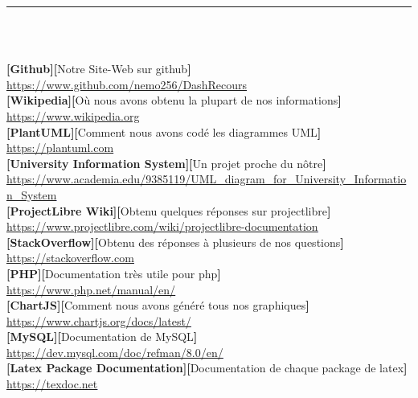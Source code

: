 \documentclass[12pt]{report}
\begin{document}
\newpage

\vspace*{-0.2in}

\begin{center}
    {\color{Blue} \rule{5.5in}{1.4mm} }\\
    \vspace{0.1in}
    \scshape{\fontsize{34}{46}{\bfseries{\color{Blue}{Webographie}}}}
    \\
    \vspace{0.5in}
\end{center}
\large
\renewcommand{\ULdepth}{1.8pt}
\textbf{[Github][}Notre Site-Web sur github\textbf{]}\\
\textcolor{blue}{\uline{\url{https://www.github.com/nemo256/DashRecours}}}
\\
\textbf{[Wikipedia][}Où nous avons obtenu la plupart de nos informations\textbf{]}\\
\textcolor{blue}{\uline{\url{https://www.wikipedia.org}}}
\\
\textbf{[PlantUML][}Comment nous avons codé les diagrammes UML\textbf{]}\\
\textcolor{blue}{\uline{\url{https://plantuml.com}}}
\\
\textbf{[University Information System][}Un projet proche du nôtre\textbf{]}\\
\textcolor{blue}{\uline{\url{https://www.academia.edu/9385119/UML_diagram_for_University_Information_System}}}
\\
\textbf{[ProjectLibre Wiki][}Obtenu quelques réponses sur projectlibre\textbf{]}\\
\textcolor{blue}{\uline{\url{https://www.projectlibre.com/wiki/projectlibre-documentation}}}
\\
\textbf{[StackOverflow][}Obtenu des réponses à plusieurs de nos questions\textbf{]}\\
\textcolor{blue}{\uline{\url{https://stackoverflow.com}}}
\\
\textbf{[PHP][}Documentation très utile pour php\textbf{]}\\
\textcolor{blue}{\uline{\url{https://www.php.net/manual/en/}}}
\\
\textbf{[ChartJS][}Comment nous avons généré tous nos graphiques\textbf{]}\\
\textcolor{blue}{\uline{\url{https://www.chartjs.org/docs/latest/}}}
\\
\textbf{[MySQL][}Documentation de MySQL\textbf{]}\\
\textcolor{blue}{\uline{\url{https://dev.mysql.com/doc/refman/8.0/en/}}}
\\
\textbf{[Latex Package Documentation][}Documentation de chaque package de latex\textbf{]}\\
\textcolor{blue}{\uline{\url{https://texdoc.net}}}
\end{document}
